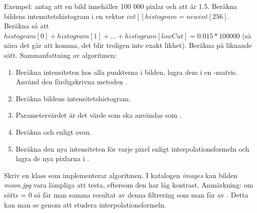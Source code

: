 Exempel: antag att en bild innehåller 100 000 pixlar och att  är 1.5. Beräkna bildens intensitetshistogram i en vektor $int[] histogram = new int[256]$. Beräkna  så att $histogram[0] + histogram[1] + ... + histogram[lowCut] = 0.015 * 100000$ (så nära det går att komma, det blir troligen inte exakt likhet). Beräkna  på liknande sätt.
Sammanfattning av algoritmen:
\begin{enumerate}
	\item Beräkna intensiteten hos alla punkterna i bilden, lagra dem i en -matris. Använd den färdigskrivna metoden .
	\item Beräkna bildens intensitetshistogram.
	\item Parametervärdet  är det värde som ska användas som .
	\item Beräkna  och  enligt ovan.
	\item Beräkna den nya intensiteten för varje pixel enligt interpolationsformeln och lagra de nya pixlarna i .
\end{enumerate}
Skriv en klass  som implementerar algoritmen. I katalogen \emph{images} kan bilden \emph{moon.jpg} vara lämpliga att testa, eftersom den har låg kontrast. Anmärkning: om  sätts = 0 så får man samma resultat av denna filtrering som man får av . Detta kan man se genom att studera interpolationsformeln.

